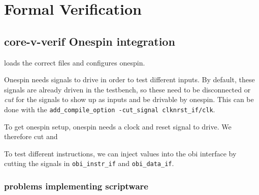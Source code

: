 \chapter{Formal Verification}
\label{ch:formal}

\section{core-v-verif Onespin integration}

 loads the correct files and configures onespin. 


Onespin needs signals to drive in order to test different inputs. By default, these signals are already driven in the testbench, so these need to be disconnected or \textit{cut} for the signals to show up as inputs and be drivable by onespin. This can be done with the \lstinline{add_compile_option -cut_signal clknrst_if/clk}.

To get onespin setup, onespin needs a clock and reset signal to drive. We therefore cut  and 


To test different instructions, we can inject values into the obi interface by cutting the signals in \lstinline{obi_instr_if} and \lstinline{obi_data_if}.


\subsection{problems implementing scriptware}


